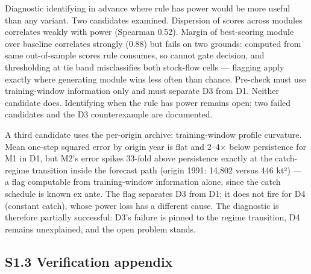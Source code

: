 \documentclass[11pt]{article}
\begin{document}
Diagnostic identifying in advance where rule has power would be more
useful than any variant. Two candidates examined. Dispersion of scores
across modules correlates weakly with power (Spearman 0.52). Margin of
best-scoring module over baseline correlates strongly (0.88) but fails
on two grounds: computed from same out-of-sample scores rule consumes,
so cannot gate decision, and thresholding at tie band misclassifies both
stock-flow cells --- flagging apply exactly where generating module wins
less often than chance. Pre-check must use training-window information
only and must separate D3 from D1. Neither candidate does. Identifying
when the rule has power remains open; two failed candidates and the D3
counterexample are documented.

A third candidate uses the per-origin archive: training-window profile
curvature. Mean one-step squared error by origin year is flat and 2--4×
below persistence for M1 in D1, but M2's error spikes 33-fold above
persistence exactly at the catch-regime transition inside the forecast
path (origin 1991: 14,802 versus 446 kt²) --- a flag computable from
training-window information alone, since the catch schedule is known ex
ante. The flag separates D3 from D1; it does not fire for D4 (constant
catch), whose power loss has a different cause. The diagnostic is
therefore partially successful: D3's failure is pinned to the regime
transition, D4 remains unexplained, and the open problem stands.

\subsection{S1.3 Verification
appendix}\label{s1.3-verification-appendix}
\end{document}
